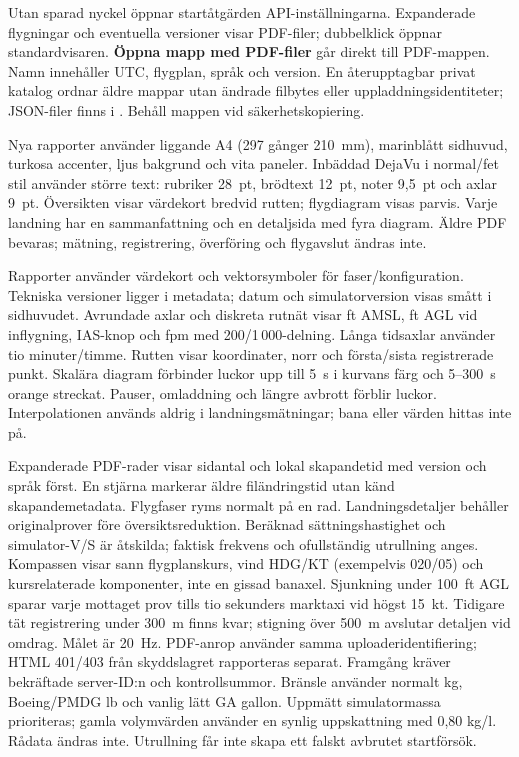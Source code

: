 \documentclass[11pt,a4paper]{article}
\newcommand{\filepath}[1]{\path{#1}}
\newcommand{\ui}[1]{\textbf{#1}}
\begin{document}
Utan sparad nyckel öppnar startåtgärden API-inställningarna. Expanderade
flygningar och eventuella versioner visar PDF-filer; dubbelklick öppnar
standardvisaren.
\ui{Öppna mapp med PDF-filer} går direkt till PDF-mappen. Namn innehåller UTC,
flygplan, språk och version. En återupptagbar privat katalog ordnar äldre
mappar utan ändrade filbytes eller uppladdningsidentiteter; JSON-filer finns
i \filepath{reports/.metadata/}. Behåll mappen vid säkerhetskopiering.

Nya rapporter använder liggande A4 (297 gånger 210~mm), marinblått sidhuvud,
turkosa accenter, ljus bakgrund och vita paneler. Inbäddad DejaVu i normal/fet
stil använder större text: rubriker 28~pt, brödtext 12~pt, noter 9,5~pt och
axlar 9~pt. Översikten visar värdekort bredvid rutten; flygdiagram visas parvis.
Varje landning har en sammanfattning och en detaljsida med fyra diagram.
Äldre PDF bevaras; mätning, registrering, överföring och flygavslut ändras inte.

Rapporter använder värdekort och vektorsymboler för faser/konfiguration.
Tekniska versioner ligger i metadata; datum och simulatorversion visas smått
i sidhuvudet. Avrundade axlar och diskreta rutnät visar ft AMSL, ft AGL vid
inflygning, IAS-knop och fpm med 200/1\,000-delning. Långa tidsaxlar använder
tio minuter/timme. Rutten visar koordinater, norr och första/sista registrerade
punkt. Skalära diagram förbinder luckor upp till 5~s i kurvans färg och
5--300~s orange streckat. Pauser, omladdning och längre avbrott förblir luckor.
Interpolationen används aldrig i landningsmätningar; bana eller värden hittas
inte på.

Expanderade PDF-rader visar sidantal och lokal skapandetid med version och
språk först. En stjärna markerar äldre filändringstid utan känd
skapandemetadata.
Flygfaser ryms normalt på en rad. Landningsdetaljer behåller originalprover
före översiktsreduktion. Beräknad sättningshastighet och simulator-V/S är
åtskilda; faktisk frekvens och ofullständig utrullning anges. Kompassen visar
sann flygplanskurs, vind HDG/KT (exempelvis 020/05) och kursrelaterade
komponenter,
inte en gissad banaxel. Sjunkning under 100~ft AGL sparar varje mottaget prov
tills tio sekunders marktaxi vid högst 15~kt. Tidigare tät registrering under
300~m finns kvar; stigning över 500~m avslutar detaljen vid omdrag. Målet är
20~Hz.
PDF-anrop använder samma uploaderidentifiering; HTML 401/403 från skyddslagret
rapporteras separat. Framgång kräver bekräftade server-ID:n och kontrollsummor.
Bränsle använder normalt kg, Boeing/PMDG lb och vanlig lätt GA gallon. Uppmätt
simulatormassa prioriteras; gamla volymvärden använder en synlig uppskattning
med 0,80 kg/l. Rådata ändras inte. Utrullning får inte skapa ett falskt avbrutet
startförsök.
\end{document}
